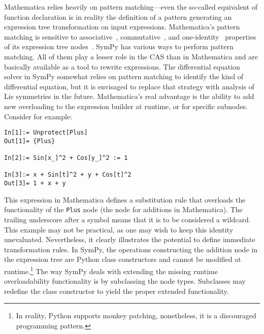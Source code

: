 


Mathematica relies heavily on pattern matching---even the so-called equivalent of function declaration is in reality
the definition of a pattern generating an expression tree transformation
on input expressions.
%
Mathematica's pattern matching is sensitive to
associative~\cite{WolframRefFlat}, commutative~\cite{WolframRefOrderless}, and
one-identity~\cite{WolframRefOneIdentity} properties of its expression tree
nodes~\cite{WolframRefFlatAndOrderlessFunctions}.
%
SymPy has various ways to perform pattern matching.
All of them play a lesser role in the CAS than in Mathematica
and are basically available as a tool to rewrite expressions.
The differential equation solver in SymPy somewhat relies on pattern matching to
identify the kind of differential equation, but it is envisaged to replace
that strategy with analysis of Lie symmetries in the future.
Mathematica's real advantage is the ability to add new overloading to the
expression builder at runtime, or for specific subnodes.
Consider for example:
\begin{verbatim}
In[1]:= Unprotect[Plus]
Out[1]= {Plus}

In[2]:= Sin[x_]^2 + Cos[y_]^2 := 1

In[3]:= x + Sin[t]^2 + y + Cos[t]^2
Out[3]= 1 + x + y
\end{verbatim}
This expression in Mathematica defines a substitution rule that overloads
the functionality of the \texttt{Plus} node (the node for additions in Mathematica).
The trailing underscore after a symbol means that it is to be considered a
wildcard.
This example may not be practical, as one may wish to keep this identity
unevaluated.  Nevertheless, it clearly illustrates the potential to define
immediate transformation rules.
In SymPy, the operations constructing the addition node in the expression tree
are Python class constructors
and cannot be modified at runtime.\footnote{In reality, Python supports monkey patching,
nonetheless, it is a discouraged programming pattern.}
The way SymPy deals with extending the missing runtime overloadability functionality
is by subclassing the node types.
Subclasses may redefine the class constructor to yield the proper
extended functionality.



